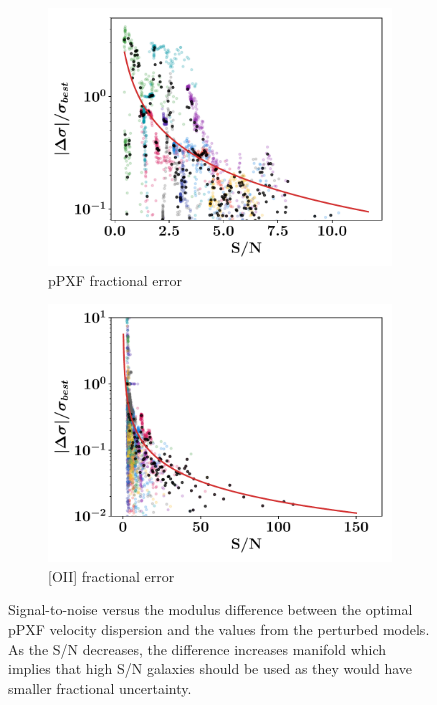 \documentclass[12pt, twocolumn]{revtex4}    %
\begin{document}
\begin{figure}
  \begin{subfigure}[b]{0.495\textwidth}
    \includegraphics[width=\textwidth]{data/frac_error_vs_sn_ppxf}
    \captionsetup{justification=justified}
    \caption{pPXF fractional error}
    \label{fig:image_sn_vband}
  \end{subfigure}
  \begin{subfigure}[b]{0.495\textwidth}
    \includegraphics[width=\textwidth]{data/frac_error_vs_sn_lmfit}
    \captionsetup{justification=justified}    
    \caption{[OII] fractional error}
    \label{fig:spec_sn_vband}
  \end{subfigure}
  \captionsetup{justification=justified}
  \caption[HUDF Objects]{Signal-to-noise versus the modulus difference between the optimal pPXF velocity dispersion and the values from the perturbed models. As the S/N decreases, the difference increases manifold which implies that high S/N galaxies should be used as they would have smaller fractional uncertainty.}
  \label{fig:sn_vband}
\end{figure}
\end{document}
